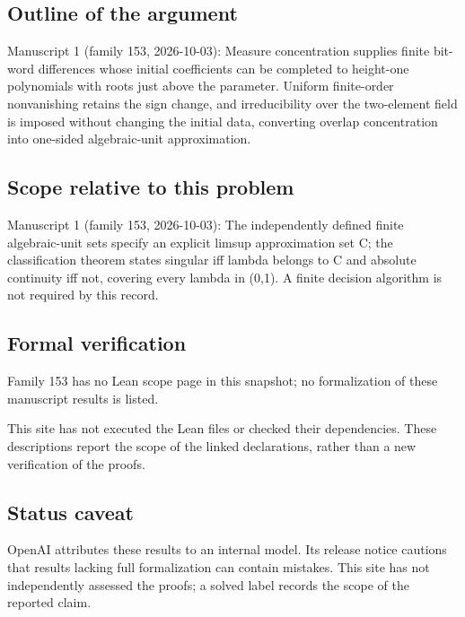 \documentclass[11pt]{article}
\begin{document}
\subsection{Outline of the argument}
Manuscript 1 (family 153, 2026-10-03): Measure concentration supplies finite bit-word differences whose initial coefficients can be completed to height-one polynomials with roots just above the parameter. Uniform finite-order nonvanishing retains the sign change, and irreducibility over the two-element field is imposed without changing the initial data, converting overlap concentration into one-sided algebraic-unit approximation.

\subsection{Scope relative to this problem}
Manuscript 1 (family 153, 2026-10-03): The independently defined finite algebraic-unit sets specify an explicit limsup approximation set C; the classification theorem states singular iff lambda belongs to C and absolute continuity iff not, covering every lambda in (0,1). A finite decision algorithm is not required by this record.

\subsection{Formal verification}
Family 153 has no Lean scope page in this snapshot; no formalization of these manuscript results is listed.

This site has not executed the Lean files or checked their dependencies. These descriptions report the scope of the linked declarations, rather than a new verification of the proofs.

\subsection{Status caveat}
OpenAI attributes these results to an internal model. Its release notice cautions that results lacking full formalization can contain mistakes. This site has not independently assessed the proofs; a solved label records the scope of the reported claim.
\end{document}
